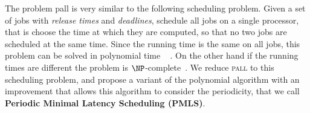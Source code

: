 \documentclass[10pt, conference, letterpaper]{IEEEtran}
\newcommand\pall{\textsc{pall}\xspace}
\begin{document}
%      
%
%     
% 
%
%
 
     
     The problem pall is very similar to the following scheduling problem. Given a set of jobs with \emph{release times} and  \emph{deadlines}, schedule all jobs on a single processor, that is choose the time at which they are computed, so that no two jobs are scheduled at the same time. Since the running time is the same on all jobs, this problem can be solved in polynomial time ~\cite{simons1978fast} . On the other hand if the running times are different the problem is $\NP$-complete~\cite{lenstra1977complexity}. 
%     
     We reduce \pall to this scheduling problem, and propose a variant of the polynomial algorithm with an improvement that allows this algorithm to consider the periodicity, that we call {\bf Periodic Minimal Latency Scheduling (PMLS)}.
     
\end{document}
